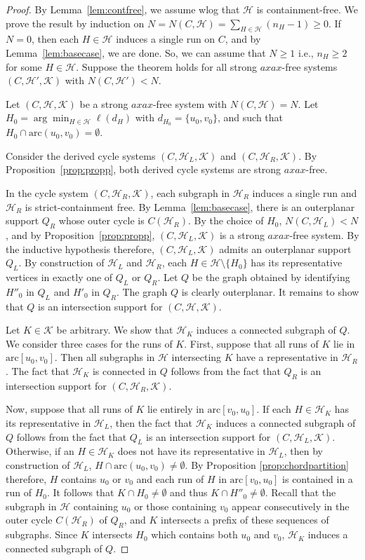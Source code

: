\documentclass[12pt]{article}
\newcommand{\HH}{\mathcal{H}}
\newcommand{\KK}{\mathcal{K}}
\newcommand{\arc}{\mathrm{arc}}
\theoremstyle{case}
\begin{document}
\outintsupport*
\begin{proof}
By Lemma~\ref{lem:contfree}, we assume wlog that $\HH$ is containment-free.
We prove the result by induction on $N=N(C,\mathcal{H})=\sum_{H\in\mathcal{H}}(n_H-1)\ge 0$.
If $N=0$, then each $H\in\mathcal{H}$ induces a single run on $C$, and by
Lemma~\ref{lem:basecase}, we are done.
So, we can assume that $N\ge 1$ i.e., $n_H\ge 2$ for some $H\in\mathcal{H}$.
Suppose the theorem holds for all strong $axax$-free systems $(C,\mathcal{H}',\mathcal{K})$ with $N(C,\mathcal{H}')<N$.

Let $(C,\mathcal{H,K})$ be a strong $axax$-free system with $N(C,\mathcal{H})=N$.
Let $H_0=\arg\min_{H\in\mathcal{H}}\ell(d_H)$ with $d_{H_0}=\{u_0,v_0\}$, and such that $H_0\cap \arc(u_0,v_0)=\emptyset$. 

Consider the derived cycle systems $(C,\mathcal{H}_L,\mathcal{K})$
and $(C,\mathcal{H}_R,\mathcal{K})$. By Proposition~\ref{prop:propp},
both derived cycle systems are strong $axax$-free.

In the cycle system $(C,\mathcal{H}_R, \mathcal{K})$, each
subgraph in $\mathcal{H}_R$ induces a single run and $\HH_R$ is strict-containment free. By Lemma~\ref{lem:basecase}, there is an outerplanar support $Q_R$
whose outer cycle is $C(\mathcal{H}_R)$.
By the choice of $H_0$, $N(C,\mathcal{H}_L)<N$, and by Proposition~\ref{prop:propp}, $(C,\HH_L,\KK)$ is a strong $axax$-free system. By the inductive hypothesis therefore, $(C,\HH_L,\KK)$
admits an outerplanar support $Q_L$.
By construction of $\mathcal{H}_L$ and $\HH_R$, each $H\in\HH\setminus\{H_0\}$ has its representative vertices in exactly one of $Q_L$ or $Q_R$.
Let $Q$ be the graph obtained by identifying $H''_0$ in $Q_L$ and $H'_0$ in
$Q_R$. The graph $Q$ is clearly outerplanar.
It remains to show that $Q$ is an intersection support for $(C,\HH,\KK)$.

Let $K\in\KK$ be arbitrary.
We show that $\HH_K$ induces a connected subgraph of $Q$.
We consider three cases for the runs of $K$.
First, suppose that all runs of $K$ lie in $\arc[u_0,v_0]$. Then all subgraphs in $\HH$ intersecting $K$ have a representative in $\HH_R$.
The fact that $\HH_K$ is connected in $Q$ follows from the fact that $Q_R$ is an intersection support for 
$(C,\HH_R,\KK)$.

Now, suppose that all runs of $K$ lie entirely in $\arc[v_0,u_0]$.
If each $H\in\HH_K$ has its representative in $\HH_L$, then the fact that $\HH_K$ induces a connected subgraph of $Q$ follows from the fact that $Q_L$ is an intersection support for $(C,\HH_L,\KK)$.
Otherwise, if an $H\in\HH_K$ does not have its representative in $\HH_L$, then by construction of $\HH_L$, $H\cap\arc(u_0,v_0)\ne\emptyset$.
By Proposition \ref{prop:chordpartition} therefore, $H$ contains $u_0$ or $v_0$ and each run of $H$ in $\arc[v_0,u_0]$ is contained in a run of $H_0$.
It follows that $K\cap H_0\ne\emptyset$ and thus $K\cap H''_0\ne\emptyset$.
Recall that the subgraph in $\HH$ containing $u_0$ or those containing $v_0$ appear consecutively in the outer cycle $C(\HH_R)$ of $Q_R$, and $K$ intersects a prefix of these sequences of subgraphs.
Since $K$ intersects $H_0$ which
contains both $u_0$ and $v_0$, $\HH_K$ induces a connected subgraph of $Q$.


\end{proof}
\end{document}
